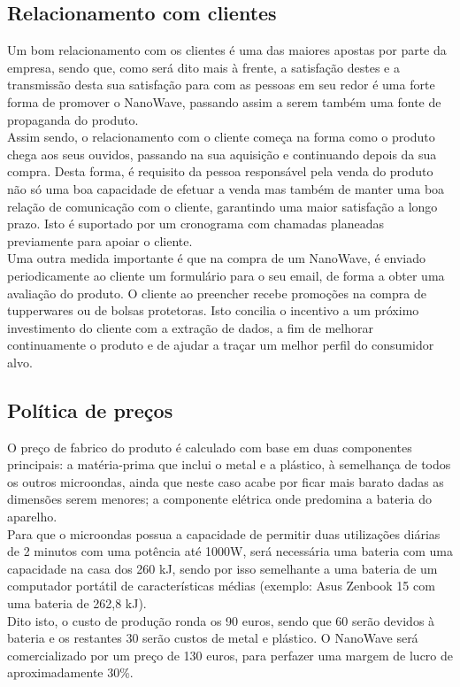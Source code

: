 \documentclass[a4paper]{article}
\begin{document}
\subsection{Relacionamento com clientes}
Um bom relacionamento com os clientes é uma das maiores apostas por parte da empresa, sendo que, como será dito mais à frente, a satisfação destes e a transmissão desta sua satisfação para com as pessoas em seu redor é uma forte forma de promover o NanoWave, passando assim a serem também uma fonte de propaganda do produto.\\
Assim sendo, o relacionamento com o cliente começa na forma como o produto chega aos seus ouvidos, passando na sua aquisição e continuando depois da sua compra. Desta forma, é requisito da pessoa responsável pela venda do produto não só uma boa capacidade de efetuar a venda mas também de manter uma boa relação de comunicação com o cliente, garantindo uma maior satisfação a longo prazo. Isto é suportado por um cronograma com chamadas planeadas previamente para apoiar o cliente.\\
Uma outra medida importante é que na compra de um NanoWave, é enviado periodicamente ao cliente um formulário para o seu email, de forma a obter uma avaliação do produto. O cliente ao preencher recebe promoções na compra de tupperwares ou de bolsas protetoras. Isto concilia o incentivo a um próximo investimento do cliente com a extração de dados, a fim de melhorar continuamente o produto e de ajudar a traçar um melhor perfil do consumidor alvo.

\subsection{Política de preços}
O preço de fabrico do produto é calculado com base em duas componentes principais: a matéria-prima que inclui o metal e a plástico, à semelhança de todos os outros microondas, ainda que neste caso acabe por ficar mais barato dadas as dimensões serem menores; a componente elétrica onde predomina a bateria do aparelho.\\
Para que o microondas possua a capacidade de permitir duas utilizações diárias de 2 minutos com uma potência até 1000W, será necessária uma bateria com uma capacidade na casa dos 260 kJ, sendo por isso semelhante a uma bateria de um computador portátil de características médias (exemplo: Asus Zenbook 15 com uma bateria de 262,8 kJ). \\
Dito isto, o custo de produção ronda os 90 euros, sendo que 60 serão devidos à bateria e os restantes 30 serão custos de metal e plástico. O NanoWave será comercializado por um preço de 130 euros, para perfazer uma margem de lucro de aproximadamente 30\%.
\end{document}
